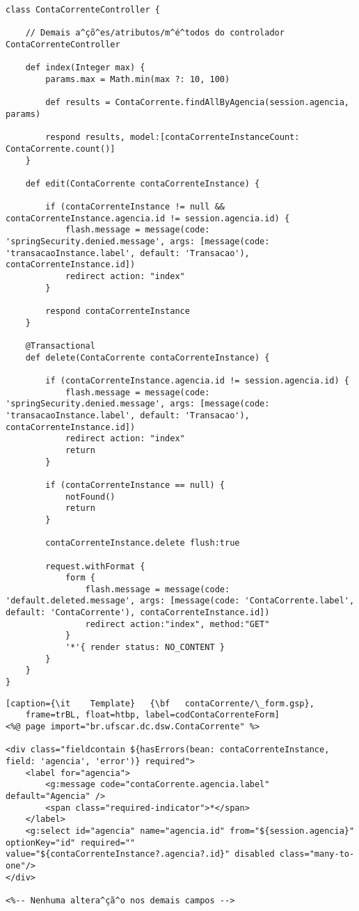 \begin{lstlisting}[caption=Controlador       {\bf      ContaCorrenteController},
    frame=trBL, float=htbp, label=codContaCorrenteController] 
class ContaCorrenteController {

    // Demais a^çõ^es/atributos/m^é^todos do controlador ContaCorrenteController

    def index(Integer max) {
        params.max = Math.min(max ?: 10, 100)        

        def results = ContaCorrente.findAllByAgencia(session.agencia, params)

        respond results, model:[contaCorrenteInstanceCount: ContaCorrente.count()]
    }

    def edit(ContaCorrente contaCorrenteInstance) {
        
        if (contaCorrenteInstance != null && contaCorrenteInstance.agencia.id != session.agencia.id) {
            flash.message = message(code: 'springSecurity.denied.message', args: [message(code: 'transacaoInstance.label', default: 'Transacao'), contaCorrenteInstance.id])
            redirect action: "index"
        }

        respond contaCorrenteInstance
    }

    @Transactional
    def delete(ContaCorrente contaCorrenteInstance) {
        
        if (contaCorrenteInstance.agencia.id != session.agencia.id) {
            flash.message = message(code: 'springSecurity.denied.message', args: [message(code: 'transacaoInstance.label', default: 'Transacao'), contaCorrenteInstance.id])
            redirect action: "index"
            return
        }

        if (contaCorrenteInstance == null) {
            notFound()
            return
        }

        contaCorrenteInstance.delete flush:true

        request.withFormat {
            form {
                flash.message = message(code: 'default.deleted.message', args: [message(code: 'ContaCorrente.label', default: 'ContaCorrente'), contaCorrenteInstance.id])
                redirect action:"index", method:"GET"
            }
            '*'{ render status: NO_CONTENT }
        }
    }
}
\end{lstlisting}

\begin{lstlisting}[caption={\it    Template}   {\bf   contaCorrente/\_form.gsp},
    frame=trBL, float=htbp, label=codContaCorrenteForm]
<%@ page import="br.ufscar.dc.dsw.ContaCorrente" %>

<div class="fieldcontain ${hasErrors(bean: contaCorrenteInstance, field: 'agencia', 'error')} required">
	<label for="agencia">
		<g:message code="contaCorrente.agencia.label" default="Agencia" />
		<span class="required-indicator">*</span>
	</label>
	<g:select id="agencia" name="agencia.id" from="${session.agencia}" optionKey="id" required="" value="${contaCorrenteInstance?.agencia?.id}" disabled class="many-to-one"/>
</div>

<%-- Nenhuma altera^çã^o nos demais campos -->

\end{lstlisting}

